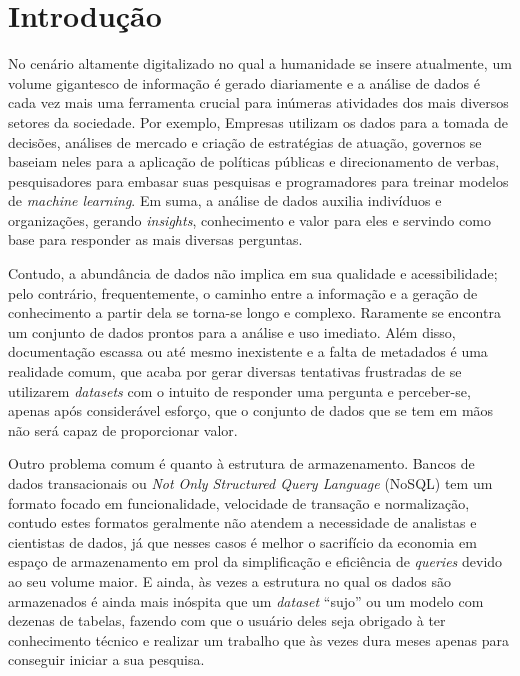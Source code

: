 \chapter{Introdução}

    No cenário altamente digitalizado no qual a humanidade se insere atualmente, um volume gigantesco de informação é gerado diariamente e a análise de dados é cada vez mais uma ferramenta crucial para inúmeras atividades dos mais diversos setores da sociedade. Por exemplo, Empresas utilizam os dados para a tomada de decisões, análises de mercado e criação de estratégias de atuação, governos se baseiam neles para a aplicação de políticas públicas e direcionamento de verbas, pesquisadores para embasar suas pesquisas e programadores para treinar modelos de \textit{machine learning}. Em suma, a análise de dados auxilia indivíduos e organizações, gerando \textit{insights}, conhecimento e valor para eles e servindo como base para responder as mais diversas perguntas.

    Contudo, a abundância de dados não implica em sua qualidade e acessibilidade; pelo contrário, frequentemente, o caminho entre a informação e a geração de conhecimento a partir dela se torna-se longo e complexo. Raramente se encontra um conjunto de dados prontos para a análise e uso imediato. Além disso, documentação escassa ou até mesmo inexistente e a falta de metadados é uma realidade comum, que acaba por gerar diversas tentativas frustradas de se utilizarem \textit{datasets} com o intuito de responder uma pergunta e perceber-se, apenas após considerável esforço, que o conjunto de dados que se tem em mãos não será capaz de proporcionar valor.

    Outro problema comum é quanto à estrutura de armazenamento. Bancos de dados transacionais ou \textit{Not Only Structured Query Language} (NoSQL) tem um formato focado em funcionalidade, velocidade de transação e normalização, contudo estes formatos geralmente não atendem a necessidade de analistas e cientistas de dados, já que nesses casos é melhor o sacrifício da economia em espaço de armazenamento em prol da simplificação e eficiência de \textit{queries} devido ao seu volume maior. E ainda, às vezes a estrutura no qual os dados são armazenados é ainda mais inóspita que um \textit{dataset} ``sujo'' ou um modelo com dezenas de tabelas, fazendo com que o usuário deles seja obrigado à ter conhecimento técnico e realizar um trabalho que às vezes dura meses apenas para conseguir iniciar a sua pesquisa.

